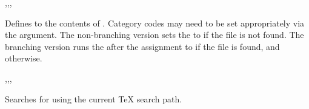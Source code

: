 \documentclass[oneside]{book}
\begin{document}
\begin{function}{\FileGet,\FileGetT,\FileGetF,\FileGetTF}
\begin{syntax}
   
    
    
     
\end{syntax}
Defines  to the contents of .
Category codes may need to be set appropriately via the 
argument.
The non-branching version sets the  to  if the file is
not found. The branching version runs the  after the
assignment to  if the file is found, and 
otherwise.
\end{function}

\begin{function}{\FileIfExist,\FileIfExistT,\FileIfExistF,\FileIfExistTF}
\begin{syntax}
 
  
  
   
\end{syntax}
Searches for  using the current \TeX{} search path.
\end{function}

\end{document}
